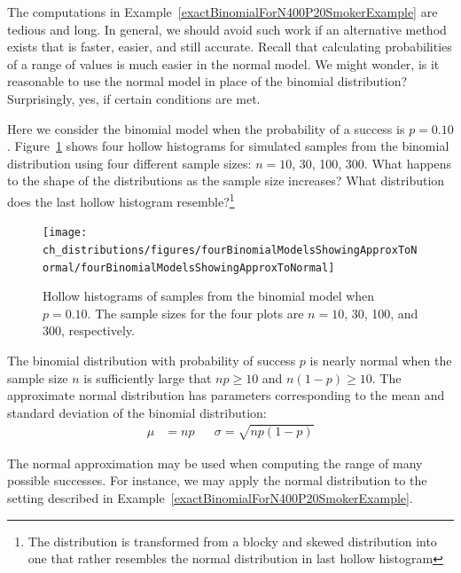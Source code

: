 The computations in Example~\ref{exactBinomialForN400P20SmokerExample} are tedious and long. In general, we should avoid such work if an alternative method exists that is faster, easier, and still accurate. Recall that calculating probabilities of a range of values is much easier in the normal model. We might wonder, is it reasonable to use the normal model in place of the binomial distribution? Surprisingly, yes, if certain conditions are met.

\begin{exercise}
Here we consider the binomial model when the probability of a success is $p=0.10$. Figure~\ref{fourBinomialModelsShowingApproxToNormal} shows four hollow histograms for simulated samples from the binomial distribution using four different sample sizes: $n=10$, 30, 100, 300. What happens to the shape of the distributions as the sample size increases? What distribution does the last hollow histogram resemble?\footnote{The distribution is transformed from a blocky and skewed distribution into one that rather resembles the normal distribution in last hollow histogram}
\end{exercise}

\begin{figure}[h]
\centering
\texttt{[image: ch\_distributions/figures/fourBinomialModelsShowingApproxToNormal/fourBinomialModelsShowingApproxToNormal]}
\caption{Hollow histograms of samples from the binomial model when $p=0.10$. The sample sizes for the four plots are $n=10$, 30, 100, and 300, respectively.}
\label{fourBinomialModelsShowingApproxToNormal}
\end{figure}

\begin{termBox}{
The binomial distribution with probability of success $p$ is nearly normal when the sample size $n$ is sufficiently large that $np\ge 10$ and $n(1-p)\ge 10$. The approximate normal distribution has parameters corresponding to the mean and standard deviation of the binomial distribution:\vspace{-1.5mm}
\begin{align*}
\mu &= np
&&\sigma= \sqrt{np(1-p)}
\end{align*}}
\end{termBox}

The normal approximation may be used when computing the range of many possible successes. For instance, we may apply the normal distribution to the setting described in Example~\ref{exactBinomialForN400P20SmokerExample}.

